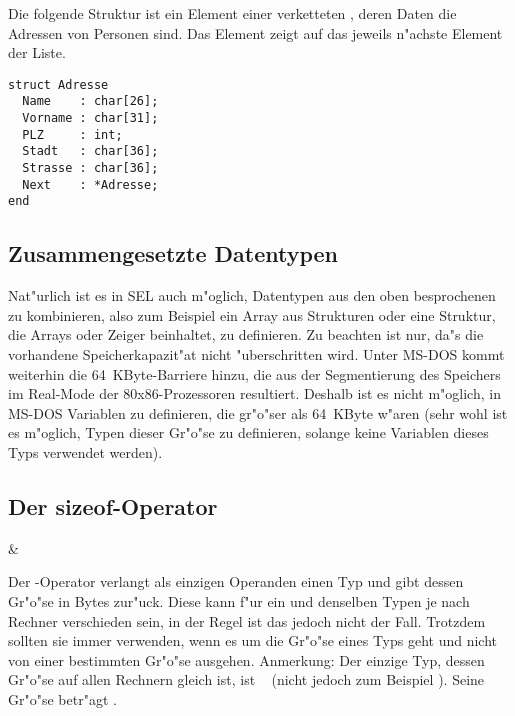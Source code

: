 \example
Die folgende Struktur ist ein Element einer verketteten ,
deren Daten die Adressen von Personen sind. Das Element 
zeigt auf das jeweils n"achste Element der Liste.

\begin{verbatim}
struct Adresse
  Name    : char[26];
  Vorname : char[31];
  PLZ     : int;
  Stadt   : char[36];
  Strasse : char[36];
  Next    : *Adresse;
end
\end{verbatim}

\subsection{Zusammengesetzte Datentypen}

Nat"urlich ist es in SEL auch m"oglich, Datentypen aus den oben
besprochenen zu kombinieren, also zum Beispiel ein Array aus
Strukturen oder eine Struktur, die Arrays oder Zeiger beinhaltet,
zu definieren. Zu beachten ist nur, da"s die vorhandene
Speicherkapazit"at nicht "uberschritten wird. Unter MS-DOS
kommt weiterhin die 64~KByte-Barriere hinzu, die aus der
Segmentierung des Speichers im Real-Mode der 80x86-Prozessoren
resultiert. Deshalb ist es nicht m"oglich, in MS-DOS Variablen zu
definieren, die gr"o"ser als 64~KByte w"aren (sehr wohl ist es
m"oglich, Typen dieser Gr"o"se zu definieren, solange keine
Variablen dieses Typs verwendet werden).

\subsection{Der sizeof-Operator}

\begin{operator}
  & \tint\
\end{operator}

Der -Operator verlangt als einzigen Operanden einen
Typ und gibt dessen Gr"o"se in Bytes zur"uck. Diese kann f"ur
ein und denselben Typen je nach Rechner verschieden sein, in der
Regel ist das jedoch nicht der Fall. Trotzdem sollten sie immer
 verwenden, wenn es um die Gr"o"se eines Typs geht und
nicht von einer bestimmten Gr"o"se ausgehen. Anmerkung: Der
einzige Typ, dessen Gr"o"se auf allen Rechnern gleich ist, ist
\tvoid\
(nicht jedoch zum Beispiel ). Seine
Gr"o"se betr"agt .

